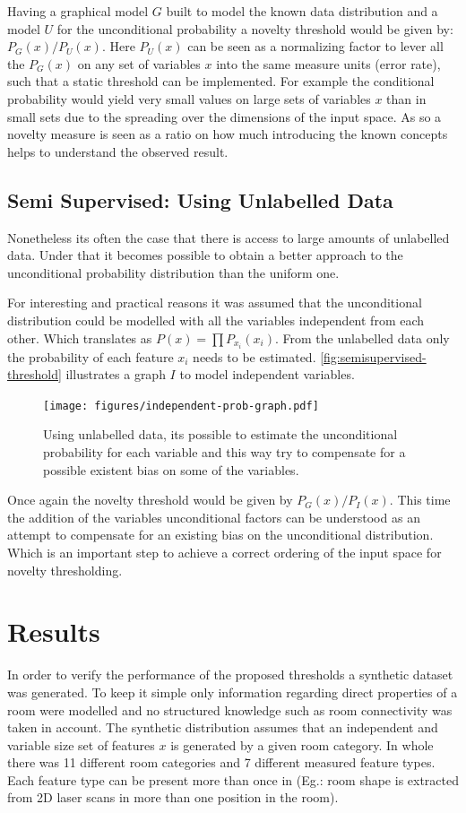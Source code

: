 \documentclass[runningheads,a4paper]{llncs}
\begin{document}
Having a graphical model $G$ built to model the known data distribution and a model
$U$ for the unconditional probability a novelty threshold would be given by:
$P_G(x)/P_U(x)$.
Here $P_{U}(x)$ can be seen as a normalizing factor to lever all the $P_G(x)$ on any set of
variables $x$ into the same measure units (error rate), such that a static threshold can be implemented.
For example the conditional probability would yield very small values on large sets of variables
$x$ than in small sets due to the spreading over the dimensions of the input space.
As so a novelty measure is seen as a ratio on how much introducing the known concepts helps to
understand the observed result.


\subsection{Semi Supervised: Using Unlabelled Data}
Nonetheless its often the case that there is access to large amounts of unlabelled data.
Under that it becomes possible to obtain a better approach to the unconditional probability
distribution than the uniform one.

For interesting and practical reasons it was assumed that the unconditional distribution
could be modelled with all the variables independent from each other.
Which translates as $P(x)=\prod{P_{x_i}(x_i)}$.
From the unlabelled data only the probability of each feature $x_i$ needs to be estimated.
\autoref{fig:semisupervised-threshold} illustrates a graph $I$ to model independent variables.

\begin{figure}[h]
\centering
\texttt{[image: figures/independent-prob-graph.pdf]}
\caption{\label{fig:semisupervised-threshold}Using unlabelled data, its possible to estimate
         the unconditional probability for each variable and this way try to compensate
         for a possible existent bias on some of the variables.}
\end{figure}

Once again the novelty threshold would be given by $P_G(x)/P_I(x)$.
This time the addition of the variables unconditional factors can be understood as an
attempt to compensate for an existing bias on the unconditional distribution.
Which is an important step to achieve a correct ordering of the input space for novelty
thresholding.


\section{Results}
In order to verify the performance of the proposed thresholds a synthetic dataset
was generated. To keep it simple only information regarding direct properties of
a room were modelled and no structured knowledge such as room connectivity was taken
in account.
The synthetic distribution assumes that an independent and variable size set of features
$x$ is generated by a given room category.
In whole there was 11 different room categories and 7 different measured feature
types. Each feature type can be present more than once in (Eg.: room shape is
extracted from 2D laser scans in more than one position in the room).
\end{document}
